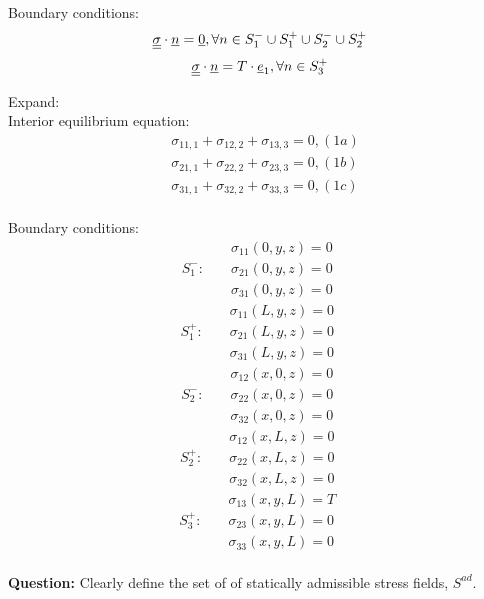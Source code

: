\documentclass[letter,12pt]{article}
\begin{document}
 Boundary conditions: 
 \begin{equation}
 \underline{\underline{\sigma}} \cdot \underline{n} = \underline{0}, \forall n \in S_{1}^{-} \cup S_{1}^{+} \cup S_{2}^{-} \cup S_{2}^{+}
 \end{equation}
 \begin{equation}
 \underline{\underline{\sigma}} \cdot \underline{n} = T \cdot \underline{e}_{1}, \forall n \in S_{3}^{+}
 \end{equation}

 Expand: \\
 Interior equilibrium equation:
 \begin{equation}
 \begin{aligned}
 & \sigma_{11,1}+\sigma_{12,2}+\sigma_{13,3}=0, (1a) \\
 & \sigma_{21,1}+\sigma_{22,2}+\sigma_{23,3}=0, (1b) \\
 & \sigma_{31,1}+\sigma_{32,2}+\sigma_{33,3}=0, (1c)
 \end{aligned}
 \end{equation} \\
 
 Boundary conditions: 
 \begin{equation}
 S_{1}^{-}: \text{	}
 \begin{aligned}
 &\sigma_{11}(0,y,z)=0\\
 &\sigma_{21}(0,y,z)=0\\
 &\sigma_{31}(0,y,z)=0
 \end{aligned}
 \end{equation}
 \begin{equation}
 S_{1}^{+}: \text{	}
 \begin{aligned}
 &\sigma_{11}(L,y,z)=0\\
 &\sigma_{21}(L,y,z)=0\\
 &\sigma_{31}(L,y,z)=0
 \end{aligned}
 \end{equation}
 \begin{equation}
 S_{2}^{-}: \text{	}
 \begin{aligned}
 &\sigma_{12}(x,0,z)=0\\
 &\sigma_{22}(x,0,z)=0\\
 &\sigma_{32}(x,0,z)=0
 \end{aligned}
 \end{equation}
 \begin{equation}
 S_{2}^{+}: \text{	}
 \begin{aligned}
 &\sigma_{12}(x,L,z)=0\\
 &\sigma_{22}(x,L,z)=0\\
 &\sigma_{32}(x,L,z)=0
 \end{aligned}
 \end{equation}
 \begin{equation}
 S_{3}^{+}: \text{	}
 \begin{aligned}
 &\sigma_{13}(x,y,L)=T\\
 &\sigma_{23}(x,y,L)=0\\
 &\sigma_{33}(x,y,L)=0
 \end{aligned}
 \end{equation}
 \\ 
 \noindent \textbf{Question:} Clearly define the set of of statically admissible stress fields, $S^{ad}$. \\
 
\end{document}
